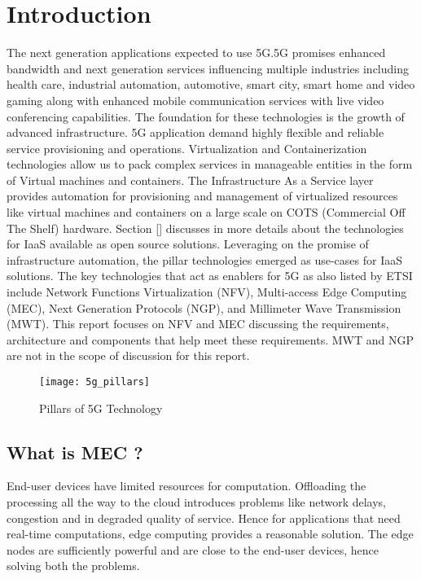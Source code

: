 \section{Introduction}


The next generation applications expected to use 5G.5G promises enhanced bandwidth and next generation services influencing multiple industries including health care, industrial automation, automotive, smart city, smart home and video gaming along with enhanced mobile communication services with live video conferencing capabilities. The foundation for these technologies is the growth of advanced infrastructure. 5G application demand highly flexible and reliable service provisioning and operations. Virtualization and Containerization technologies allow us to pack complex services in manageable entities in the form of Virtual machines and containers. The Infrastructure As a Service layer provides automation for provisioning and management of virtualized resources like virtual machines and containers on a large scale on COTS (Commercial Off The Shelf) hardware. Section [] discusses in more details about the technologies for IaaS available as open source solutions. Leveraging on the promise of infrastructure automation, the pillar technologies emerged as use-cases for IaaS solutions. The key technologies that act as enablers for 5G as also listed by ETSI include Network Functions Virtualization (NFV), Multi-access Edge Computing (MEC), Next Generation Protocols (NGP), and Millimeter Wave Transmission (MWT). This report focuses on NFV and MEC discussing the requirements, architecture and components that help meet these requirements. MWT and NGP are not in the scope of discussion for this report.

\begin{figure}
	\centering
	\texttt{[image: 5g\_pillars]}
	\label{fig:figure1}
	\caption{Pillars of 5G Technology}
\end{figure}

\subsection{What is MEC ?}

End-user devices have limited resources for computation. Offloading the processing all the way to the cloud introduces problems like network delays, congestion and in degraded quality of service. Hence for applications that need real-time computations, edge computing provides a reasonable solution. The edge nodes are sufficiently powerful and are close to the end-user devices, hence solving both the problems.


